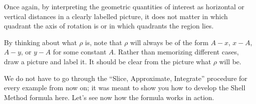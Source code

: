 \documentclass{ximera}
\begin{document}
\begin{remark}
Once again, by interpreting the geometric quantities of interest as horizontal or vertical distances in a clearly labelled picture, it does not matter in which quadrant the axis of rotation is or in which quadrants the region lies. 
\end{remark}

\begin{remark}
By thinking about what $\rho$ is,  note that $\rho$ will always be of the form $A-x$, $x-A$, $A-y$, or $y-A$ for some constant $A$.  Rather than memorizing different cases, draw a picture and label it.  It should be clear from the picture what $\rho$ will be. 
\end{remark}


We do not have to go through the ``Slice, Approximate, Integrate'' procedure for every example from now on; it was meant to show you how to develop the Shell Method formula here.  Let's see now how the formula works in action.
\end{document}
